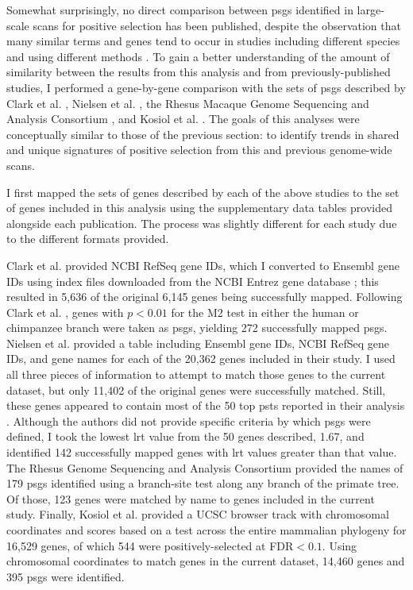 Somewhat surprisingly, no direct comparison between \acp{psg}
identified in large-scale scans for positive selection has been
published, despite the observation that many similar terms and genes
tend to occur in studies including different species and using
different methods \citep{Nielsen2005,Kosiol2008}. To gain a better
understanding of the amount of similarity between the results from
this analysis and from previously-published studies, I performed a
gene-by-gene comparison with the sets of \acp{psg} described by Clark
et al. \citeyearpar{Clark2003}, Nielsen et
al. \citeyearpar{Nielsen2005}, the Rhesus Macaque Genome Sequencing
and Analysis Consortium \citeyearpar{Macaque2007}, and Kosiol et
al. \citeyearpar{Kosiol2008}. The goals of this analyses were
conceptually similar to those of the previous section: to identify
trends in shared and unique signatures of positive selection from this
and previous genome-wide scans.

I first mapped the sets of genes described by each of the above
studies to the set of genes included in this analysis using the
supplementary data tables provided alongside each publication. The
process was slightly different for each study due to the different
formats provided.

Clark et al. \citeyearpar{Clark2003} provided NCBI RefSeq gene IDs,
which I converted to Ensembl gene IDs using index files downloaded
from the NCBI Entrez gene database \citep{Maglott2005}; this resulted
in 5,636 of the original 6,145 genes being successfully
mapped. Following Clark et al. \citeyearpar{Clark2003}, genes with
$p<0.01$ for the M2 test in either the human or chimpanzee branch were
taken as \acp{psg}, yielding 272 successfully mapped
\acp{psg}. Nielsen et al. \citeyearpar{Nielsen2005} provided a table
including Ensembl gene IDs, NCBI RefSeq gene IDs, and gene names for
each of the 20,362 genes included in their study. I used all three
pieces of information to attempt to match those genes to the current
dataset, but only 11,402 of the original genes were successfully
matched. Still, these genes appeared to contain most of the 50 top
\acp{pst} reported in their analysis \citep{Nielsen2005}. Although the
authors did not provide specific criteria by which \acp{psg} were
defined, I took the lowest \ac{lrt} value from the 50 genes described,
1.67, and identified 142 successfully mapped genes with \ac{lrt}
values greater than that value. The Rhesus Genome Sequencing and
Analysis Consortium \citeyearpar{Macaque2007} provided the names of
179 \acp{psg} identified using a branch-site test along any branch of
the primate tree. Of those, 123 genes were matched by name to genes
included in the current study. Finally, Kosiol et
al. \citeyearpar{Kosiol2008} provided a UCSC browser track with
chromosomal coordinates and scores based on a test across the entire
mammalian phylogeny for 16,529 genes, of which 544 were
positively-selected at FDR$<0.1$. Using chromosomal coordinates to
match genes in the current dataset, 14,460 genes and 395 \acp{psg}
were identified.

